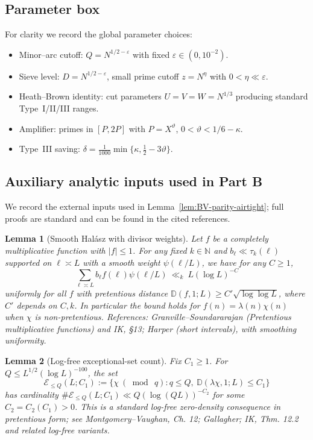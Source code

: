 \documentclass[11pt]{article}
\newtheorem{lemma}{Lemma}[part]
\theoremstyle{definition}
\theoremstyle{remark}
\numberwithin{equation}{part}
\begin{document}
\subsection{Parameter box}

For clarity we record the global parameter choices:
\begin{itemize}
	\item Minor--arc cutoff: $Q=N^{1/2-\varepsilon}$ with fixed $\varepsilon\in(0,10^{-2})$.
	\item Sieve level: $D=N^{1/2-\varepsilon}$, small prime cutoff $z=N^\eta$ with $0<\eta\ll\varepsilon$.
	\item Heath--Brown identity: cut parameters $U=V=W=N^{1/3}$ producing standard Type~I/II/III ranges.
	\item Amplifier: primes in $[P,2P]$ with $P=X^\vartheta$, $0<\vartheta<1/6-\kappa$.
	\item Type~III saving: $\delta=\tfrac{1}{1000}\min\{\kappa,\tfrac12-3\vartheta\}$.
\end{itemize}
\subsection{Auxiliary analytic inputs used in Part B}

We record the external inputs used in Lemma~\ref{lem:BV-parity-airtight}; full proofs are standard and can be found in the cited references.

\begin{lemma}[Smooth Hal\'asz with divisor weights]\label{lem:halasz-smooth}
	Let $f$ be a completely multiplicative function with $|f|\le 1$. For any fixed $k\in\mathbb N$ and $b_\ell\ll \tau_k(\ell)$ supported on $\ell\asymp L$ with a smooth weight $\psi(\ell/L)$, we have for any $C\ge 1$,
	\[
		\sum_{\ell\asymp L} b_\ell f(\ell)\psi(\ell/L)\ \ll_{k}\ L(\log L)^{-C}
	\]
	uniformly for all $f$ with pretentious distance $\mathbb D(f,1;L)\ge C'\sqrt{\log\log L}$, where $C'$ depends on $C,k$. In particular the bound holds for $f(n)=\lambda(n)\chi(n)$ when $\chi$ is non-pretentious. References: Granville--Soundararajan (Pretentious multiplicative functions) and IK, §13; Harper (short intervals), with smoothing uniformity.
\end{lemma}

\begin{lemma}[Log-free exceptional-set count]\label{lem:logfree-density}
	Fix $C_1\ge 1$. For $Q\le L^{1/2}(\log L)^{-100}$, the set
	\[
		\mathcal E_{\le Q}(L;C_1):=\{\chi\ (\bmod\ q): q\le Q,\ \mathbb D(\lambda\chi,1;L)\le C_1\}
	\]
	has cardinality $\#\mathcal E_{\le Q}(L;C_1)\ll Q(\log (QL))^{-C_2}$ for some $C_2=C_2(C_1)>0$. This is a standard log-free zero-density consequence in pretentious form; see Montgomery--Vaughan, Ch. 12; Gallagher; IK, Thm. 12.2 and related log-free variants.
\end{lemma}
\end{document}
